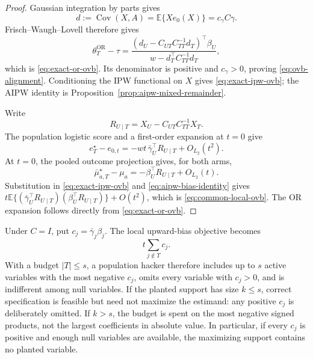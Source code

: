 \documentclass[a4paper,10pt,english]{article}
\newcommand{\E}{\mathbb E}
\begin{document}
\begin{proof}
Gaussian integration by parts gives
\begin{equation*}
 d:=\operatorname{Cov}(X,A)=\E\{Xe_0(X)\}=c_\gamma C\gamma.
\end{equation*}
Frisch--Waugh--Lovell therefore gives
\begin{equation*}
 \theta_T^{\mathrm{OR}}-\tau
 =\frac{(d_U-C_{UT}C_{TT}^{-1}d_T)^\top\beta_U}
 {w-d_T^\top C_{TT}^{-1}d_T},
\end{equation*}
which is \eqref{eq:exact-or-ovb}.  Its denominator is positive and
$c_\gamma>0$, proving \eqref{eq:ovb-alignment}.  Conditioning the IPW
functional on $X$ gives \eqref{eq:exact-ipw-ovb}; the AIPW identity is
Proposition~\ref{prop:aipw-mixed-remainder}.

Write
\begin{equation*}
 R_{U\mid T}=X_U-C_{UT}C_{TT}^{-1}X_T.
\end{equation*}
The population logistic score and a first-order expansion at $t=0$ give
\begin{equation*}
 e_T^\star-e_{0,t}
 =-wt\,\bar\gamma_U^\top R_{U\mid T}+O_{L_2}(t^2).
\end{equation*}
At $t=0$, the pooled outcome projection gives, for both arms,
\begin{equation*}
 \bar\mu_{a,T}^\star-\mu_a
 =-\beta_U^\top R_{U\mid T}+O_{L_2}(t).
\end{equation*}
Substitution in \eqref{eq:exact-ipw-ovb} and
\eqref{eq:aipw-bias-identity} gives
$t\E\{(\bar\gamma_U^\top R_{U\mid T})
(\beta_U^\top R_{U\mid T})\}+O(t^2)$, which is
\eqref{eq:common-local-ovb}.  The OR expansion follows directly from
\eqref{eq:exact-or-ovb}.
\end{proof}

Under $C=I$, put $c_j=\bar\gamma_j\beta_j$.  The local upward-bias
objective becomes
\begin{equation}\label{eq:independent-omission-objective}
 t\sum_{j\notin T}c_j.
\end{equation}
With a budget $|T|\le s$, a population hacker therefore includes up to
$s$ active variables with the most negative $c_j$, omits every variable
with $c_j>0$, and is indifferent among null variables.  If the planted
support has size $k\le s$, correct specification is feasible but need not
maximize the estimand: any positive $c_j$ is deliberately omitted.  If
$k>s$, the budget is spent on the most negative signed products, not the
largest coefficients in absolute value.  In particular, if every $c_j$ is
positive and enough null variables are available, the maximizing support
contains no planted variable.
\end{document}
